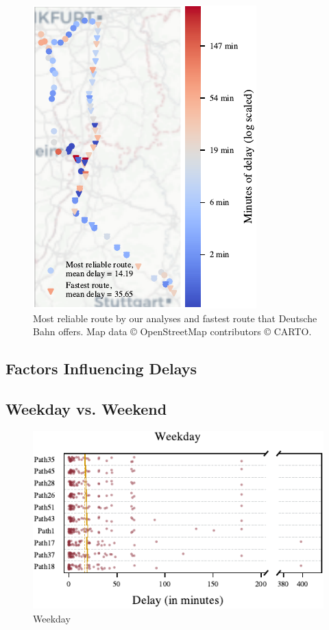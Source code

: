 \documentclass{article}
\theoremstyle{plain}
\theoremstyle{definition}
\theoremstyle{remark}
\begin{document}
\begin{figure} %
\begin{center}
\includegraphics{fig/maps_KI_03_reliable_vs_fastest_zoomed_Carto.pdf} %
\end{center}
\caption{Most reliable route by our analyses and fastest route that Deutsche Bahn offers. Map data © OpenStreetMap contributors © CARTO.}
\end{figure}

\subsection{Factors Influencing Delays}\label{sec:results_ext}

\subsection{Weekday vs. Weekend}
\begin{figure} 
    \includegraphics{fig/plot_FP_01_Weekday.pdf}
    \caption{Weekday}
\end{figure} 
\end{document}
